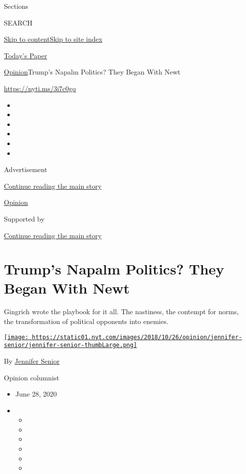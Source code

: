 Sections

SEARCH

\protect\hyperlink{site-content}{Skip to
content}\protect\hyperlink{site-index}{Skip to site index}

\href{https://myaccount.nytimes.com/auth/login?response_type=cookie\&client_id=vi}{}

\href{https://www.nytimes.com/section/todayspaper}{Today's Paper}

\href{/section/opinion}{Opinion}\textbar{}Trump's Napalm Politics? They
Began With Newt

\href{https://nyti.ms/3i7c0gq}{https://nyti.ms/3i7c0gq}

\begin{itemize}
\item
\item
\item
\item
\item
\item
\end{itemize}

Advertisement

\protect\hyperlink{after-top}{Continue reading the main story}

\href{/section/opinion}{Opinion}

Supported by

\protect\hyperlink{after-sponsor}{Continue reading the main story}

\hypertarget{trumps-napalm-politics-they-began-with-newt}{%
\section{Trump's Napalm Politics? They Began With
Newt}\label{trumps-napalm-politics-they-began-with-newt}}

Gingrich wrote the playbook for it all. The nastiness, the contempt for
norms, the transformation of political opponents into enemies.

\href{https://www.nytimes.com/by/jennifer-senior}{\texttt{[image: https://static01.nyt.com/images/2018/10/26/opinion/jennifer-senior/jennifer-senior-thumbLarge.png]}}

By \href{https://www.nytimes.com/by/jennifer-senior}{Jennifer Senior}

Opinion columnist

\begin{itemize}
\item
  June 28, 2020
\item
  \begin{itemize}
  \item
  \item
  \item
  \item
  \item
  \item
  \end{itemize}
\end{itemize}

